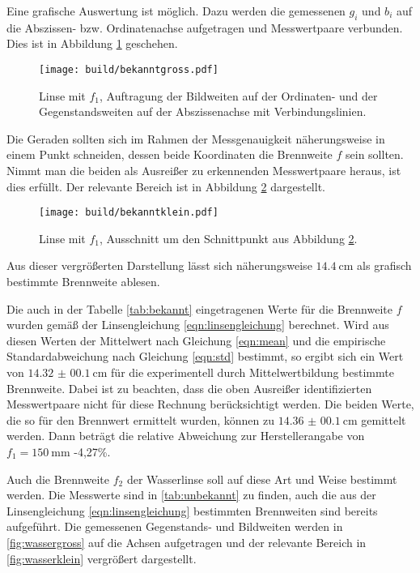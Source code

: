 Eine grafische Auswertung ist möglich. Dazu werden die gemessenen $g_i$ und
$b_i$ auf die Abszissen- bzw. Ordinatenachse aufgetragen und Messwertpaare verbunden.
Dies ist in Abbildung \ref{fig:bekanntgross} geschehen.

\begin{figure}%
  \centering
  \texttt{[image: build/bekanntgross.pdf]}
  \caption{Linse mit $f_1$, Auftragung der Bildweiten auf der Ordinaten- und der Gegenstandsweiten auf der Abszissenachse mit Verbindungslinien.}
  \label{fig:bekanntgross}
\end{figure}

Die Geraden sollten sich im Rahmen der Messgenauigkeit näherungsweise in einem Punkt
schneiden, dessen beide Koordinaten die Brennweite $f$ sein sollten. Nimmt man die
beiden als Ausreißer zu erkennenden Messwertpaare heraus, ist dies
erfüllt. Der relevante Bereich ist in Abbildung \ref{fig:bekanntklein} dargestellt.

\begin{figure}%
  \centering
  \texttt{[image: build/bekanntklein.pdf]}
  \caption{Linse mit $f_1$, Ausschnitt um den Schnittpunkt aus Abbildung \ref{fig:bekanntklein}.}
  \label{fig:bekanntklein}
\end{figure}

Aus dieser vergrößerten Darstellung lässt sich näherungsweise $\SI{14.4}{\centi\meter}$ als grafisch
bestimmte Brennweite ablesen.

Die auch in der Tabelle \ref{tab:bekannt} eingetragenen Werte für die Brennweite $f$ wurden gemäß der
Linsengleichung \eqref{eqn:linsengleichung} berechnet. Wird aus diesen Werten
der Mittelwert nach Gleichung \eqref{eqn:mean} und die empirische Standardabweichung
nach Gleichung \eqref{eqn:std} bestimmt, so ergibt sich ein Wert von $\SI{14.32(0010)}{\centi\meter}$
für die experimentell durch Mittelwertbildung bestimmte Brennweite. Dabei ist zu
beachten, dass die oben Ausreißer identifizierten Messwertpaare nicht für diese Rechnung
berücksichtigt werden. Die beiden Werte, die so für den Brennwert ermittelt wurden,
können zu $\SI{14.36(0010)}{\centi\meter}$
gemittelt werden. Dann beträgt die relative Abweichung zur Herstellerangabe von
$f_1 = \SI{150}{\milli\meter}$ -4,27\%.

Auch die Brennweite $f_2$ der Wasserlinse soll auf diese Art und Weise bestimmt werden.
Die Messwerte sind in \ref{tab:unbekannt} zu finden, auch die aus der Linsengleichung \eqref{eqn:linsengleichung}
bestimmten Brennweiten sind bereits aufgeführt.
Die gemessenen Gegenstands- und Bildweiten werden in \ref{fig:wassergross} auf die Achsen aufgetragen
und der relevante Bereich in \ref{fig:wasserklein} vergrößert dargestellt.

